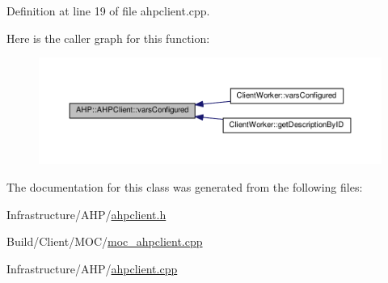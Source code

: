 Definition at line 19 of file ahpclient.\+cpp.



Here is the caller graph for this function\+:
\nopagebreak
\begin{figure}[H]
\begin{center}
\leavevmode
\includegraphics[width=350pt]{class_a_h_p_1_1_a_h_p_client_ac2783516a8ea9e8ed1feaf2564816b97_icgraph}
\end{center}
\end{figure}




The documentation for this class was generated from the following files\+:\begin{DoxyCompactItemize}
\item 
Infrastructure/\+A\+H\+P/\hyperlink{ahpclient_8h}{ahpclient.\+h}\item 
Build/\+Client/\+M\+O\+C/\hyperlink{moc__ahpclient_8cpp}{moc\+\_\+ahpclient.\+cpp}\item 
Infrastructure/\+A\+H\+P/\hyperlink{ahpclient_8cpp}{ahpclient.\+cpp}\end{DoxyCompactItemize}
